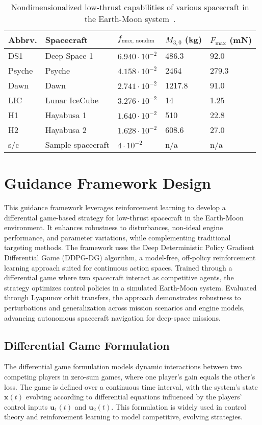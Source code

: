 \documentclass[conference]{IEEEtran}
\begin{document}
\begin{table*}[h!]
	\centering
	\caption{Nondimensionalized low-thrust capabilities of various spacecraft in the Earth-Moon system~\cite{lafarge}.}
	\label{tab:camparison}
	\begin{tabular}{|l|l|l|l|l|}
	\hline
	\textbf{Abbrv.} & \textbf{Spacecraft} & \textbf{$f_{\text{max, nondim}}$} & \textbf{$M_{3,0}$ (kg)} & \textbf{$F_{\text{max}}$ (mN)} \\ \hline
	DS1 & Deep Space 1 & $6.940 \cdot 10^{-2}$ & 486.3 & 92.0 \\ \hline
	Psyche & Psyche & $4.158 \cdot 10^{-2}$ & 2464 & 279.3 \\ \hline
	Dawn & Dawn  & $2.741 \cdot 10^{-2}$ & 1217.8 & 91.0 \\ \hline
	LIC & Lunar IceCube & $3.276 \cdot 10^{-2}$ & 14 & 1.25 \\ \hline
	H1 & Hayabusa 1 & $1.640 \cdot 10^{-2}$ & 510 & 22.8 \\ \hline
	H2 & Hayabusa 2 & $1.628 \cdot 10^{-2}$ & 608.6 & 27.0 \\ \hline
	s/c & Sample spacecraft & $4 \cdot 10^{-2}$ & n/a & n/a \\ \hline
	\end{tabular}
\end{table*}






\section{Guidance Framework Design}
This guidance framework leverages reinforcement learning to develop a differential game-based strategy for low-thrust spacecraft in the Earth-Moon environment. It enhances robustness to disturbances, non-ideal engine performance, and parameter variations, while complementing traditional targeting methods. The framework uses the Deep Deterministic Policy Gradient Differential Game (DDPG-DG) algorithm, a model-free, off-policy reinforcement learning approach suited for continuous action spaces. Trained through a differential game where two spacecraft interact as competitive agents, the strategy optimizes control policies in a simulated Earth-Moon system. Evaluated through Lyapunov orbit transfers, the approach demonstrates robustness to perturbations and generalization across mission scenarios and engine models, advancing autonomous spacecraft navigation for deep-space missions.

\subsection{Differential Game Formulation}
The differential game formulation models dynamic interactions between two competing players in zero-sum games, where one player’s gain equals the other's loss. The game is defined over a continuous time interval, with the system's state \( \boldsymbol{x}(t) \) evolving according to differential equations influenced by the players’ control inputs \( \boldsymbol{u}_1(t) \) and \( \boldsymbol{u}_2(t) \). This formulation is widely used in control theory and reinforcement learning to model competitive, evolving strategies.
\end{document}
